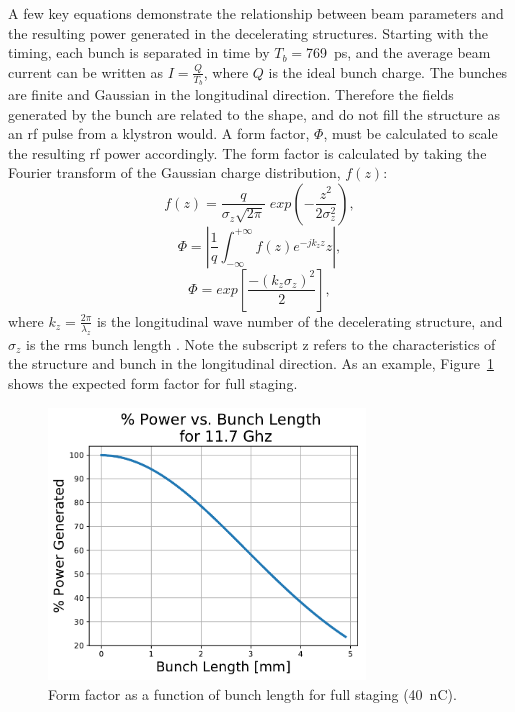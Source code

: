 A few key equations demonstrate the relationship between beam 
parameters and the resulting power generated in the decelerating structures.  
Starting with the timing, each bunch is separated
in time by $T_{b}=$\SI{769}{ps}, and the average beam current can be written as $I=\frac{Q}{T_{b}}$, 
where $Q$ is the ideal bunch charge.
The bunches are finite and Gaussian in the longitudinal direction. Therefore the fields 
generated by the bunch are related to the shape, and do not fill the structure as an
rf pulse from a klystron would.  A form factor, $\Phi$, 
must be calculated to scale the resulting rf power accordingly. 
The form factor is calculated 
by taking the Fourier transform of the Gaussian charge distribution, $f(z)$\cite{PETSeq}: 
\begin{equation}
f\left(z\right) = \frac{q}{\sigma_z \sqrt{2\pi}}\;exp\left(-\frac{z^2}{2\sigma^2_z}\right),
\end{equation}   
\begin{equation}
\Phi = \left|\frac{1}{q}\int_{-\infty}^{+\infty}f\left(z\right)e^{-jk_z z}z\right|,
\end{equation}
\begin{equation}
\Phi=exp\left[\frac{-(k_{z}\sigma_{z})^{2}}{2}\right] \nonumber,
\end{equation}
where $k_{z}=\frac{2\pi}{\lambda_{z}}$ is the longitudinal wave number
of the decelerating structure, and $\sigma_{z}$ is the rms bunch length \cite{PETSeq}. 
Note the subscript z refers to the characteristics of the structure and bunch in the longitudinal
direction. 
As an example, Figure~\ref{fig:form} shows the expected form factor for full staging.
\begin{figure}
	\centering
	\includegraphics[width=0.75\textwidth]{images/formfactorsqrd}
	\caption{Form factor as a function of bunch length for full staging (\SI{40}{nC}).}
	\label{fig:form}
\end{figure}

